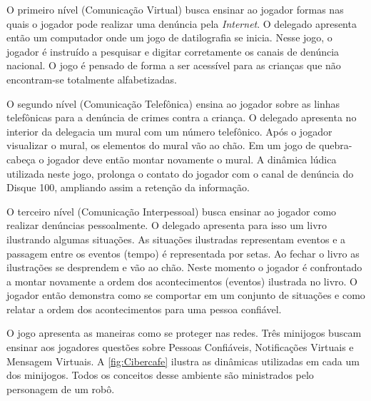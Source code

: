 O primeiro nível (Comunicação Virtual) busca ensinar ao jogador formas nas quais o jogador pode realizar uma denúncia pela \textit{Internet}. O delegado apresenta então um computador onde um jogo de datilografia se inicia. Nesse jogo, o jogador é instruído a pesquisar e digitar corretamente os canais de denúncia nacional. O jogo é pensado de forma a ser acessível para as crianças que não encontram-se totalmente alfabetizadas. 

O segundo nível (Comunicação Telefônica) ensina ao jogador sobre as linhas telefônicas para a denúncia de crimes contra a criança. O delegado apresenta no interior da delegacia um mural com um número telefônico. Após o jogador visualizar o mural, os elementos do mural vão ao chão. Em um jogo de quebra-cabeça o jogador deve então montar novamente o mural. A dinâmica lúdica utilizada neste jogo, prolonga o contato do jogador com o canal de denúncia do Disque 100, ampliando assim a retenção da informação. 

O terceiro nível (Comunicação Interpessoal) busca ensinar ao jogador como realizar denúncias pessoalmente. O delegado apresenta para isso um livro ilustrando algumas situações. As situações ilustradas representam eventos e a passagem entre os eventos (tempo) é representada por setas. Ao fechar o livro as ilustrações se desprendem e vão ao chão. Neste momento o jogador é confrontado a montar novamente a ordem dos acontecimentos (eventos) ilustrada no livro. O jogador então demonstra como se comportar em um conjunto de situações e como relatar a ordem dos acontecimentos para uma pessoa confiável. 

O jogo apresenta as maneiras como se proteger nas redes. Três minijogos buscam ensinar aos jogadores questões sobre Pessoas Confiáveis, Notificações Virtuais e Mensagem Virtuais. A \autoref{fig:Cibercafe} ilustra as dinâmicas utilizadas em cada um dos minijogos. Todos os conceitos desse ambiente são ministrados pelo personagem de um robô. 


